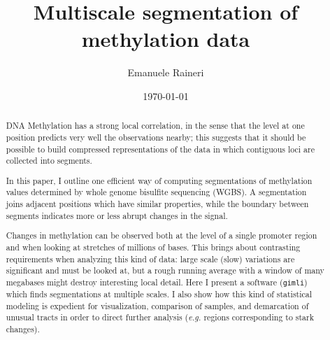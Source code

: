 \documentclass[12pt]{amsart}
\newcommand{\gimli}{\texttt{gimli}}
\newcommand{\eg}{\textit{e.g.}}
\begin{document}
\title{Multiscale segmentation of methylation data}
\author{Emanuele Raineri}
\date{\today}
\maketitle

\begin{abstract}
DNA Methylation has a strong local correlation,
in the sense that the level at one position predicts 
very well the observations nearby; this suggests that it should be possible
to build compressed representations of the data in which contiguous loci 
are collected into segments.

In this paper, I outline one efficient way of computing 
segmentations of methylation values determined by 
whole genome bisulfite sequencing (WGBS).
A segmentation joins adjacent positions
which have similar properties, while the boundary between segments 
indicates more or less abrupt changes
in the signal.

Changes in methylation can be observed both at the level of a single promoter
region  and when looking at stretches
of millions of bases.
This brings about contrasting requirements when analyzing this kind of data: 
large scale (slow) variations are 
significant and must be looked at, but a rough
running average with a window of many megabases might destroy interesting
local detail. Here I present  a software (\gimli{}) which finds  
segmentations at multiple scales.
I also show how this 
kind of statistical modeling is expedient for 
visualization, comparison of samples,
and demarcation of unusual tracts in 
order to direct further analysis 
(\eg{} regions corresponding to stark changes).


\end{abstract}
\end{document}
